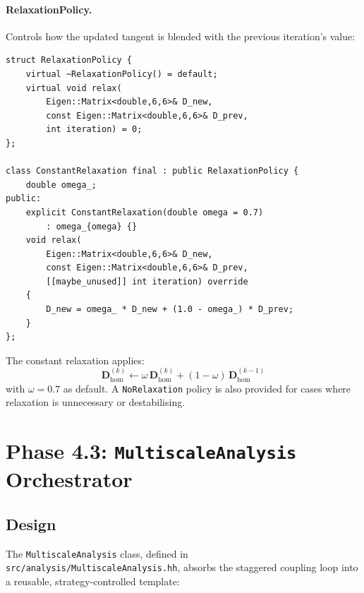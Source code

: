 \paragraph{RelaxationPolicy.}
Controls how the updated tangent is blended with the previous
iteration's value:

\begin{lstlisting}[caption={Relaxation policy implementations.},
                   label={lst:relaxation}]
struct RelaxationPolicy {
    virtual ~RelaxationPolicy() = default;
    virtual void relax(
        Eigen::Matrix<double,6,6>& D_new,
        const Eigen::Matrix<double,6,6>& D_prev,
        int iteration) = 0;
};

class ConstantRelaxation final : public RelaxationPolicy {
    double omega_;
public:
    explicit ConstantRelaxation(double omega = 0.7)
        : omega_{omega} {}
    void relax(
        Eigen::Matrix<double,6,6>& D_new,
        const Eigen::Matrix<double,6,6>& D_prev,
        [[maybe_unused]] int iteration) override
    {
        D_new = omega_ * D_new + (1.0 - omega_) * D_prev;
    }
};
\end{lstlisting}

The constant relaxation applies:
\begin{equation}
  \mathbf{D}_{\mathrm{hom}}^{(k)}
    \leftarrow
    \omega \, \mathbf{D}_{\mathrm{hom}}^{(k)}
    + (1-\omega) \, \mathbf{D}_{\mathrm{hom}}^{(k-1)}
  \label{eq:relaxation}
\end{equation}
with $\omega = 0.7$ as default.  A \texttt{NoRelaxation} policy is
also provided for cases where relaxation is unnecessary or
destabilising.


\section{Phase 4.3: \texttt{MultiscaleAnalysis} Orchestrator}
\label{sec:refactor-orchestrator}

\subsection{Design}

The \texttt{MultiscaleAnalysis} class, defined in
\texttt{src/analysis/MultiscaleAnalysis.hh}, absorbs the
staggered coupling loop into a reusable, strategy-controlled
template:

